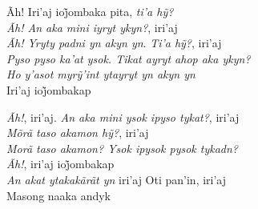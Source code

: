 \begin{linenumbers}\begingroup\raggedright
\noindent Ãh! Iri’aj ioj̃ombaka pita, \emph{ti’a hỹ?}\\
\emph{Ãh! An aka mini iyryt ykyn?}, iri'aj\\
 \emph{Ãh! Yryty padni yn akyn yn}. \emph{Ti’a hỹ?}, iri’aj\\
 \emph{Pyso pyso ka'at ysok. Tikat ayryt ahop aka ykyn?}\\
 \emph{Ho y’asot myrỹ’int ytayryt yn akyn yn}\\
 Iri’aj ioj̃ombakap

\end{linenumbers}\endgroup

\bigskip

\begin{linenumbers}\begingroup\raggedright

 \noindent \emph{Ãh!}, iri'aj. \emph{An aka mini ysok ipyso tykat?}, iri'aj\\
 \emph{Mõrã taso akamon hỹ?}, iri’aj\\
 \emph{Morã taso akamon? Ysok ipysok pysok tykadn?}\\
 \emph{Ãh!}, iri’aj ioj̃ombakap\\
 \emph{An akat ytakakãrãt yn} iri'aj Oti pan'in, iri'aj\\
 Masong naaka andyk

\end{linenumbers}\endgroup

\bigskip

